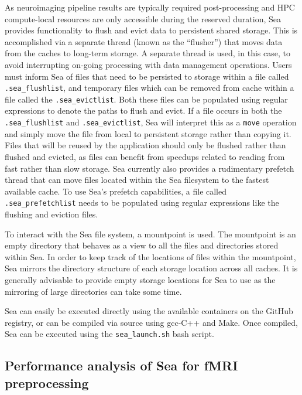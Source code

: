     As neuroimaging pipeline results are typically required post-processing and
    HPC compute-local resources are only accessible during the reserved
    duration, Sea provides functionality to flush and evict data to persistent
    shared storage. This is accomplished via a separate thread (known as the
    ``flusher'') that moves data from the caches to long-term storage. A
    separate thread is used, in this case, to avoid interrupting on-going
    processing with data management operations. Users must inform Sea of files
    that need to be persisted to storage within a file called
    \texttt{.sea\_flushlist}, and temporary files which can be removed from
    cache within a file called the \texttt{.sea\_evictlist}. Both these files
    can be populated using regular expressions to denote the paths to flush and
    evict. If a file occurs in both the \texttt{.sea\_flushlist} and
    \texttt{.sea\_evictlist}, Sea will interpret this as a \texttt{move}
    operation and simply move the file from local to persistent storage rather
    than copying it. Files that will be reused by the application should only be
    flushed rather than flushed and evicted, as files can benefit from speedups
    related to reading from fast rather than slow storage. Sea currently also
    provides a rudimentary prefetch thread that can move files located within
    the Sea filesystem to the fastest available cache. To use Sea's prefetch
    capabilities, a file called \texttt{.sea\_prefetchlist} needs to be
    populated using regular expressions like the flushing and eviction files.
    
    To interact with the Sea file system, a mountpoint is used. The mountpoint
    is an empty directory that behaves as a view to all the files and
    directories stored within Sea. In order to keep track of the locations of
    files within the mountpoint, Sea mirrors the directory structure of each
    storage location across all caches. It is generally advisable to provide
    empty storage locations for Sea to use as the mirroring of large directories
    can take some time.
    
    Sea can easily be executed directly using the available containers on the
    GitHub registry, or can be compiled via source using gcc-C++ and Make. Once
    compiled, Sea can be executed using the \texttt{sea\_launch.sh} bash script.
    
    \subsection{Performance analysis of Sea for fMRI preprocessing}
    
